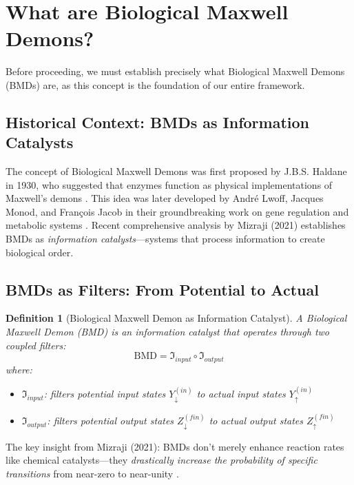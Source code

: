 \documentclass[11pt,a4paper]{article}
\newtheorem{definition}[theorem]{Definition}
\begin{document}
\section{What are Biological Maxwell Demons?}

Before proceeding, we must establish precisely what Biological Maxwell Demons (BMDs) are, as this concept is the foundation of our entire framework.

\subsection{Historical Context: BMDs as Information Catalysts}

The concept of Biological Maxwell Demons was first proposed by J.B.S. Haldane in 1930, who suggested that enzymes function as physical implementations of Maxwell's demons \cite{haldane1930enzymes}. This idea was later developed by André Lwoff, Jacques Monod, and François Jacob in their groundbreaking work on gene regulation and metabolic systems \cite{monod1971chance,jacob1970logic}. Recent comprehensive analysis by Mizraji (2021) \cite{mizraji2021biological} establishes BMDs as \textit{information catalysts}—systems that process information to create biological order.

\subsection{BMDs as Filters: From Potential to Actual}

\begin{definition}[Biological Maxwell Demon as Information Catalyst]
A Biological Maxwell Demon (BMD) is an information catalyst that operates through two coupled filters:
\begin{equation}
\text{BMD} = \Im_{input} \circ \Im_{output}
\end{equation}
where:
\begin{itemize}
\item $\Im_{input}$: filters potential input states $Y_{\downarrow}^{(in)}$ to actual input states $Y_{\uparrow}^{(in)}$
\item $\Im_{output}$: filters potential output states $Z_{\downarrow}^{(fin)}$ to actual output states $Z_{\uparrow}^{(fin)}$
\end{itemize}
\end{definition}

The key insight from Mizraji (2021): BMDs don't merely enhance reaction rates like chemical catalysts—they \textit{drastically increase the probability of specific transitions} from near-zero to near-unity \cite{mizraji2021biological}.
\end{document}
